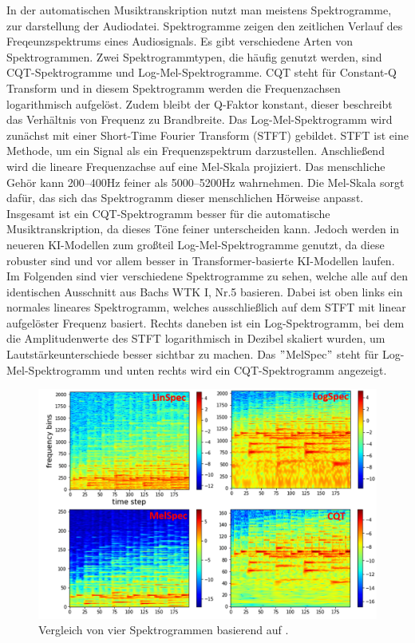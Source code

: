 In der automatischen Musiktranskription nutzt man meistens Spektrogramme, zur darstellung der Audiodatei.
Spektrogramme zeigen den zeitlichen Verlauf des Freqeunzspektrums eines Audiosignals.
Es gibt verschiedene Arten von Spektrogrammen.
Zwei Spektrogrammtypen, die häufig genutzt werden, sind CQT-Spektrogramme und Log-Mel-Spektrogramme.
CQT steht für Constant-Q Transform und in diesem Spektrogramm werden die Frequenzachsen logarithmisch aufgelöst.
Zudem bleibt der Q-Faktor konstant, dieser beschreibt das Verhältnis von Frequenz zu Brandbreite.
Das Log-Mel-Spektrogramm wird zunächst mit einer Short-Time Fourier Transform (STFT) gebildet.
STFT ist eine Methode, um ein Signal als ein Frequenzspektrum darzustellen.
Anschließend wird die lineare Frequenzachse auf eine Mel-Skala projiziert.
Das menschliche Gehör kann 200--400Hz feiner als 5000--5200Hz wahrnehmen.
Die Mel-Skala sorgt dafür, das sich das Spektrogramm dieser menschlichen Hörweise anpasst.
Insgesamt ist ein CQT-Spektrogramm besser für die automatische Musiktranskription,
da dieses Töne feiner unterscheiden kann.
Jedoch werden in neueren KI-Modellen zum großteil Log-Mel-Spektrogramme genutzt,
da diese robuster sind und vor allem besser in Transformer-basierte KI-Modellen laufen.
Im Folgenden sind vier verschiedene Spektrogramme zu sehen,
welche alle auf den identischen Ausschnitt aus Bachs WTK I, Nr.5 basieren.
Dabei ist oben links ein normales lineares Spektrogramm,
welches ausschließlich auf dem STFT mit linear aufgelöster Frequenz basiert.
Rechts daneben ist ein Log-Spektrogramm,
bei dem die Amplitudenwerte des STFT logarithmisch in Dezibel skaliert wurden,
um Lautstärkeunterschiede besser sichtbar zu machen.
Das \("\)MelSpec\("\) steht für Log-Mel-Spektrogramm und unten rechts wird ein CQT-Spektrogramm angezeigt.
\begin{figure}[H]
    \centering
    \includegraphics[width=1\textwidth]{Graphics/different_spectrograms}
    \caption[Vergleich 4 Spektrogramme]{Vergleich von vier Spektrogrammen basierend auf \cite{cheuk2020impact}.}
    \label{fig:different_specs}
\end{figure}

